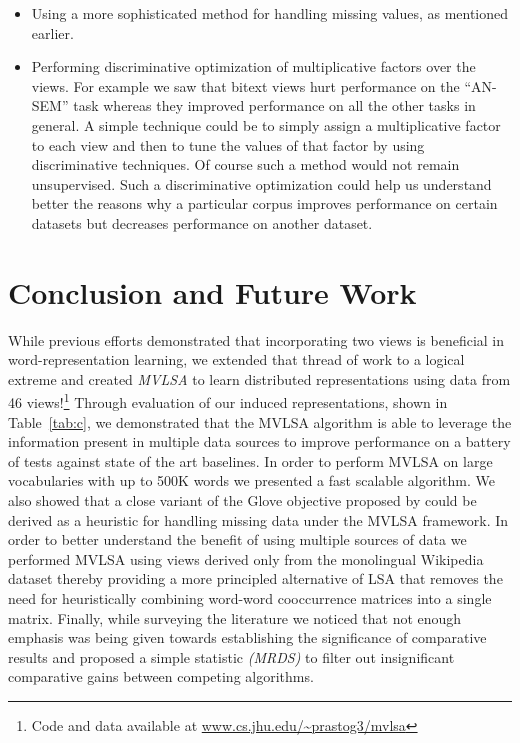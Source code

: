 \documentclass[11pt]{article}
\begin{document}
{\begin{itemize}[leftmargin=*]
  have been caused due to lack of PMI type features have been reported
  to work well by .  
\item Using a more sophisticated method for handling missing values,
  as mentioned earlier.
\item Performing discriminative optimization of multiplicative
  factors over the views. For example we saw that bitext views hurt
  performance on the ``AN-SEM'' task whereas they improved performance
  on all the other tasks in general. A simple technique could be to
  simply assign a multiplicative factor to each view and 
  then to tune the values of that factor by using discriminative
  techniques. Of course such a method would not remain unsupervised. Such a discriminative optimization could help us understand
  better the reasons why a particular corpus improves performance on
  certain datasets but decreases performance on another dataset. %
\end{itemize}
}

\section{Conclusion and Future Work}
While previous efforts demonstrated that incorporating two views is
beneficial in word-representation learning, we extended that thread of
work to a logical extreme and created \emph{MVLSA} to learn
distributed representations using data from 46 views!\footnote{Code
  and data available at \url{www.cs.jhu.edu/~prastog3/mvlsa}} Through
evaluation of our induced representations, shown in Table~\ref{tab:c},
we demonstrated that the MVLSA algorithm is able to leverage the
information present in multiple data sources to improve performance on
a battery of tests against state of the art baselines. In order to
perform MVLSA on large vocabularies with up to 500K words we presented
a fast scalable algorithm. We also showed that a close variant of the
Glove objective proposed by  could be
derived as a heuristic for handling missing data under the MVLSA
framework. In order to better understand the benefit of using multiple
sources of data we performed MVLSA using views derived only from the
monolingual Wikipedia dataset thereby providing a more principled
alternative of LSA that removes the need for heuristically combining
word-word cooccurrence matrices into a single matrix. Finally, while
surveying the literature we noticed that not enough emphasis was being
given towards establishing the significance of comparative results and
proposed a simple statistic \emph{(MRDS)} to filter out insignificant
comparative gains between competing algorithms.
\end{document}
